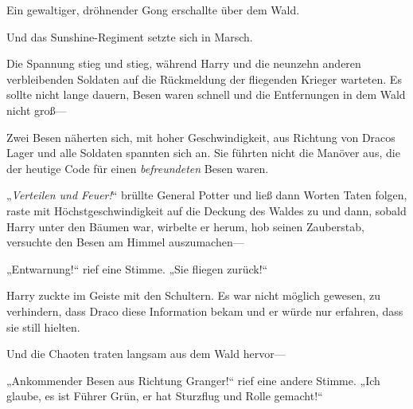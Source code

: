 \later

Ein gewaltiger, dröhnender Gong erschallte über dem Wald.

Und das Sunshine-Regiment setzte sich in Marsch.

\later

Die Spannung stieg und stieg, während Harry und die neunzehn anderen verbleibenden Soldaten auf die Rückmeldung der fliegenden Krieger warteten. Es sollte nicht lange dauern, Besen waren schnell und die Entfernungen in dem Wald nicht groß—

Zwei Besen näherten sich, mit hoher Geschwindigkeit, aus Richtung von Dracos Lager und alle Soldaten spannten sich an. Sie führten nicht die Manöver aus, die der heutige Code für einen \emph{befreundeten} Besen waren.

„\emph{Verteilen und Feuer!}“ brüllte General Potter und ließ dann Worten Taten folgen, raste mit Höchstgeschwindigkeit auf die Deckung des Waldes zu und dann, sobald Harry unter den Bäumen war, wirbelte er herum, hob seinen Zauberstab, versuchte den Besen am Himmel auszumachen—

„Entwarnung!“ rief eine Stimme. „Sie fliegen zurück!“

Harry zuckte im Geiste mit den Schultern. Es war nicht möglich gewesen, zu verhindern, dass Draco diese Information bekam und er würde nur erfahren, dass sie still hielten.

Und die Chaoten traten langsam aus dem Wald hervor—

„Ankommender Besen aus Richtung Granger!“ rief eine andere Stimme. „Ich glaube, es ist Führer Grün, er hat Sturzflug und Rolle gemacht!“

